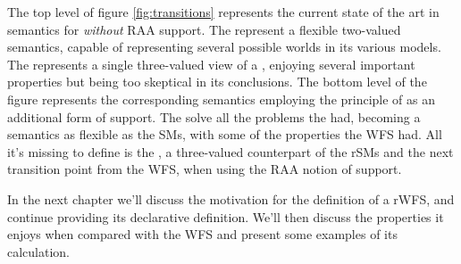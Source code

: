 The top level of figure \ref{fig:transitions} represents the current state of the art in semantics for \nlps \emph{without} RAA support. The \sms represent a flexible two-valued semantics, capable of representing several possible worlds in its various models. The \wfs represents a single three-valued view of a \nlp, enjoying several important properties but being too skeptical in its conclusions. The bottom level of the figure represents the corresponding semantics employing the principle of \raa as an additional form of support. The \rsms solve all the problems the \sms had, becoming a semantics as flexible as the SMs, with some of the properties the WFS had. All it's missing to define is the \RWFS, a three-valued counterpart of the rSMs and the next transition point from the WFS, when using the RAA notion of support.

In the next chapter we'll discuss the motivation for the definition of a rWFS, and continue providing its declarative definition. We'll then discuss the properties it enjoys when compared with the WFS and present some examples of its calculation.
